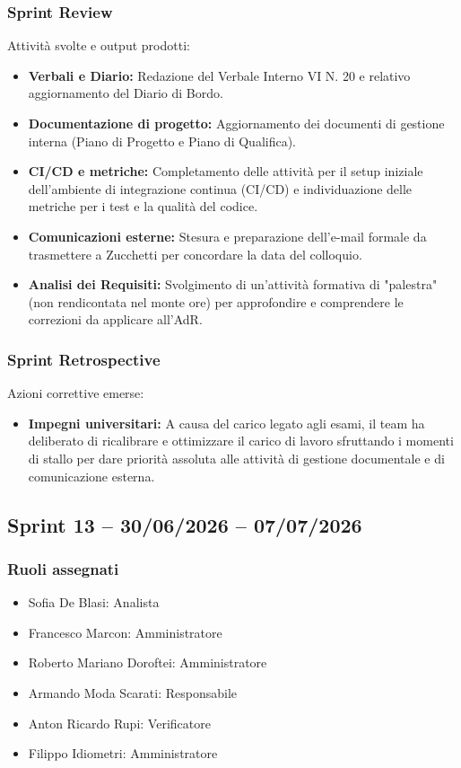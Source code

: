 \subsubsection{Sprint Review}
Attività svolte e output prodotti:
\begin{itemize}
    \item \textbf{Verbali e Diario:} Redazione del Verbale Interno VI N. 20 e relativo aggiornamento del Diario di Bordo.
    \item \textbf{Documentazione di progetto:} Aggiornamento dei documenti di gestione interna (Piano di Progetto e Piano di Qualifica).
    \item \textbf{CI/CD e metriche:} Completamento delle attività per il setup iniziale dell'ambiente di integrazione continua (CI/CD) e individuazione delle metriche per i test e la qualità del codice.
    \item \textbf{Comunicazioni esterne:} Stesura e preparazione dell'e-mail formale da trasmettere a Zucchetti per concordare la data del colloquio.
    \item \textbf{Analisi dei Requisiti:} Svolgimento di un'attività formativa di "palestra" (non rendicontata nel monte ore) per approfondire e comprendere le correzioni da applicare all'AdR.
\end{itemize}

\subsubsection{Sprint Retrospective}
Azioni correttive emerse:
\begin{itemize}
    \item \textbf{Impegni universitari:} A causa del carico legato agli esami, il team ha deliberato di ricalibrare e ottimizzare il carico di lavoro sfruttando i momenti di stallo per dare priorità assoluta alle attività di gestione documentale e di comunicazione esterna.
\end{itemize}


\subsection{Sprint 13 -- 30/06/2026 -- 07/07/2026}
\label{sec:sprint13}

\subsubsection{Ruoli assegnati}
\begin{itemize}
    \item Sofia De Blasi: Analista
    \item Francesco Marcon: Amministratore
    \item Roberto Mariano Doroftei: Amministratore
    \item Armando Moda Scarati: Responsabile
    \item Anton Ricardo Rupi: Verificatore
    \item Filippo Idiometri: Amministratore
\end{itemize}

